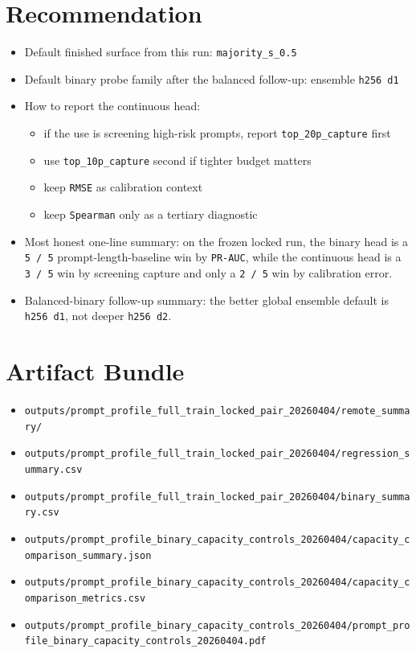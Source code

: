 \documentclass[11pt]{article}
\begin{document}
\section*{Recommendation}
\begin{itemize}[leftmargin=1.5em]
\item Default finished surface from this run: \texttt{majority\_s\_0.5}
\item Default binary probe family after the balanced follow-up: ensemble \texttt{h256 d1}
\item How to report the continuous head:
  \begin{itemize}[leftmargin=1.5em]
  \item if the use is screening high-risk prompts, report \texttt{top\_20p\_capture} first
  \item use \texttt{top\_10p\_capture} second if tighter budget matters
  \item keep \texttt{RMSE} as calibration context
  \item keep \texttt{Spearman} only as a tertiary diagnostic
  \end{itemize}
\item Most honest one-line summary: on the frozen locked run, the binary head is a \texttt{5 / 5} prompt-length-baseline win by \texttt{PR-AUC}, while the continuous head is a \texttt{3 / 5} win by screening capture and only a \texttt{2 / 5} win by calibration error.
\item Balanced-binary follow-up summary: the better global ensemble default is \texttt{h256 d1}, not deeper \texttt{h256 d2}.
\end{itemize}

\section*{Artifact Bundle}
\begin{itemize}[leftmargin=1.5em]
\item \texttt{outputs/prompt\_profile\_full\_train\_locked\_pair\_20260404/remote\_summary/}
\item \texttt{outputs/prompt\_profile\_full\_train\_locked\_pair\_20260404/regression\_summary.csv}
\item \texttt{outputs/prompt\_profile\_full\_train\_locked\_pair\_20260404/binary\_summary.csv}
\item \texttt{outputs/prompt\_profile\_binary\_capacity\_controls\_20260404/capacity\_comparison\_summary.json}
\item \texttt{outputs/prompt\_profile\_binary\_capacity\_controls\_20260404/capacity\_comparison\_metrics.csv}
\item \texttt{outputs/prompt\_profile\_binary\_capacity\_controls\_20260404/prompt\_profile\_binary\_capacity\_controls\_20260404.pdf}
\end{itemize}
\end{document}
